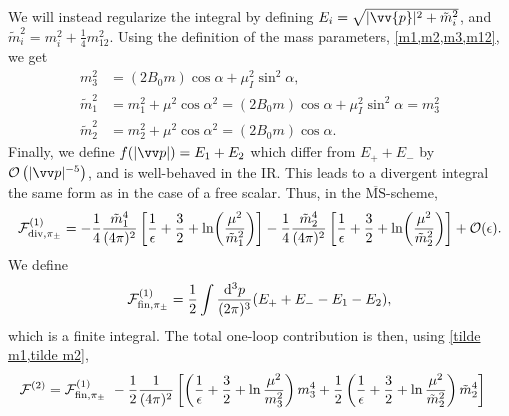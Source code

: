 We will instead regularize the integral by defining $E_i = \sqrt{|\vv{p}|^2 + \tilde m_i^2}$, and $\tilde m_i^2 = m_i^2 + \frac{1}{4} m_{12}^2$.
Using the definition of the mass parameters, \cref{m1,m2,m3,m12}, we get
\begin{align}
    m_3^2 & = (2 B_0 m) \cos \alpha + \mu_ I^2 \sin^2 \alpha, \\
    \label{tilde m1}
    \tilde m_1^2 
    & 
    = m_1^2 + \mu^2 \cos\alpha^2
    = (2 B_0 m) \cos \alpha + \mu_I^2 \sin^2 \alpha
    = m_3^2 \\
    \label{tilde m2}
    \tilde m_2^2 
    & = m_2^2 + \mu^2 \cos\alpha^2
    = (2 B_0 m) \cos \alpha.
\end{align}
Finally, we define $f(|\vv p|) = E_1 + E_2$ which differ from $E_+ + E_-$ by $\Oh[-5]{|\vv p|}$, and is well-behaved in the IR.
This leads to a divergent integral the same form as in the case of a free scalar.
Thus, in the $\mathrm{\overline{MS}}$-scheme, 
\begin{equation}
    \mathcal{F}^{(1)}_{\mathrm{div}, \pi_\pm }
    =
    - \frac{1}{4} \frac{\tilde m_1^4}{(4\pi)^2} 
    \left[
        \frac{1}{\epsilon} + \frac{3}{2} + \ln(\frac{\mu^2}{\tilde m_1^2}) 
    \right] 
    - \frac{1}{4} \frac{\tilde m_2^4}{(4\pi)^2} 
    \left[
        \frac{1}{\epsilon} + \frac{3}{2} + \ln(\frac{\mu^2}{\tilde m_2^2})
    \right] 
    + \mathcal{O}(\epsilon).
\end{equation}
We define
\begin{equation}
    \mathcal{F}^{(1)}_{\mathrm{fin}, \pi_\pm}
    = 
    \frac{1}{2} \int \frac{\dd^3 p}{(2\pi)^3} (E_+ + E_- - E_1 - E_2),
\end{equation}
which is a finite integral.
The total one-loop contribution is then, using \cref{tilde m1,tilde m2},
\begin{align}
    \Ef^{(2)}
    & = 
    \Ef^{(1)}_{\mathrm{fin}, \pi_\pm} 
    - \frac{1}{2}\frac{1}{(4\pi)^2}
    \left[
        \left( \frac{1}{\epsilon} + \frac{3}{2} + \ln \frac{\mu^2}{m_3^2 } \right)
        m_3^4
        +
        \frac{1}{2}
        \left( \frac{1}{\epsilon} + \frac{3}{2} + \ln \frac{\mu^2}{\tilde m_2^2} \right)
        \tilde m_2^4
    \right]
\end{align}
